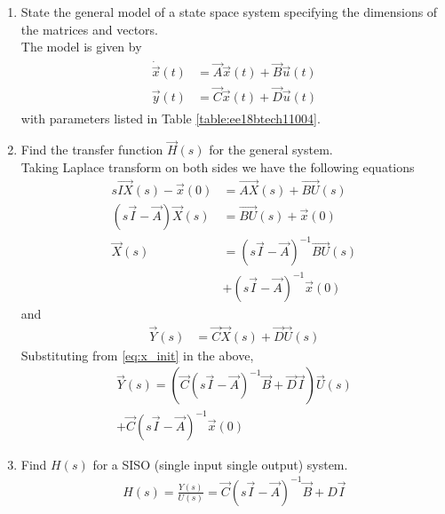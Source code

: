 \begin{enumerate}[label=\thesection.\arabic*.,ref=\thesection.\theenumi]
\item State the general model of a state space system specifying the dimensions of the matrices and vectors.
\\
\solution The model is given by 
\begin{align}
\begin{split}
\dot{\vec{x}}(t)&=\vec{A}\vec{x}(t)+\vec{B}\vec{u}(t) \\
 \vec{y}(t)&=\vec{C}\vec{x}(t)+\vec{D} \vec{u}(t)
\end{split}
\label{eq:ee18btech11004_state}
\end{align}
with parameters listed in Table \ref{table:ee18btech11004}.
%
\begin{table}[!ht]
\centering

\caption{}
\label{table:ee18btech11004}
\end{table}

\item Find the transfer function $\vec{H}(s)$ for the general system.
\\
\solution 
Taking Laplace transform on both sides we have the following equations
\begin{align}
 s\vec{IX}(s)-\vec{x}(0)&= \vec{AX}(s)+ \vec{BU}(s)\\
(s\vec{I}-\vec{A})\vec{X}(s)&= \vec{BU}(s)+ \vec{x}(0)\\
\vec{X}(s)&={(s\vec{I}-\vec{A})^{-1}}\vec{B U}(s)\\
& +(s\vec{I}-\vec{A})^{-1}\vec{x}(0)
\label{eq:ee18btech11006_x_init}
\end{align}
and
\begin{align}
\vec{Y}(s)&= \vec{C}\vec{X}(s)+\vec{D}\vec{U}(s)
\end{align}
Substituting from \eqref{eq:x_init} in the above,
%
\begin{multline}
\vec{Y}(s)=( \vec{C}{(s\vec{I}-\vec{A})^{-1}}\vec{B}+\vec{D}\vec{I}) \vec{U}(s) 
\\
+ \vec{C}(s\vec{I}-\vec{A})^{-1}\vec{x}(0)
\label{eq:ee18btech11006_yx_init}
\end{multline}
%
\item Find $H(s)$ for a SISO (single input single output) system.
\\
\solution
\begin{align}
\label{eq:ee18btech11004_siso}
H(s)= {\frac{Y(s)}{U(s)}}= \vec{C}{(s\vec{I}-\vec{A})^{-1}}\vec{B}+D\vec{I}
\end{align}


\end{enumerate}
